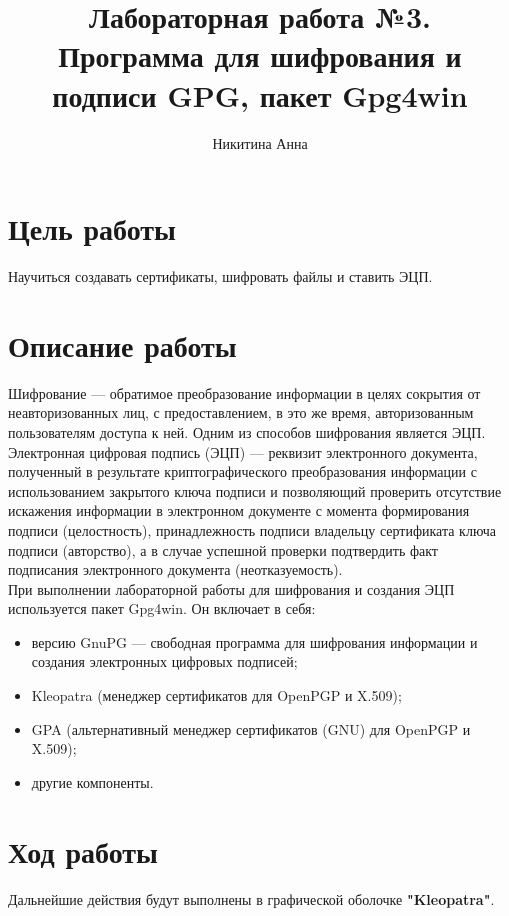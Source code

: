 \documentclass[10pt,a4paper]{report}
\author{Никитина Анна}
\title{Лабораторная работа №3.\\
	Программа для шифрования и подписи GPG, пакет Gpg4win}
\begin{document}
\maketitle
\renewcommand{\thesection}{\arabic{section}}
\tableofcontents
\pagebreak
\setcounter{totalnumber}{10}
\setcounter{topnumber}{10}
\setcounter{bottomnumber}{10}
\renewcommand{\topfraction}{1}
\renewcommand{\textfraction}{0}

\section{Цель работы}
Научиться создавать сертификаты, шифровать файлы и ставить ЭЦП.
\section{Описание работы}
Шифрование — обратимое преобразование информации в целях сокрытия от неавторизованных лиц, с предоставлением, в это же время, авторизованным пользователям доступа к ней. Одним из способов шифрования является ЭЦП. \\
Электронная цифровая подпись (ЭЦП) — реквизит электронного документа, полученный в результате криптографического преобразования информации с использованием закрытого ключа подписи и позволяющий проверить отсутствие искажения информации в электронном документе с момента формирования подписи (целостность), принадлежность подписи владельцу сертификата ключа подписи (авторство), а в случае успешной проверки подтвердить факт подписания электронного документа (неотказуемость).  \\
При выполнении лабораторной работы для шифрования и создания ЭЦП используется пакет
Gpg4win. Он включает в себя:
\begin{itemize}
\item версию GnuPG — свободная программа для шифрования информации и создания электронных цифровых подписей;
\item Kleopatra (менеджер сертификатов для OpenPGP и X.509);
\item GPA (альтернативный менеджер сертификатов (GNU) для OpenPGP и X.509);
\item другие компоненты.
\end{itemize}
\section{Ход работы}
Дальнейшие действия будут выполнены в графической оболочке \textbf{"Kleopatra"}.
\end{document}
